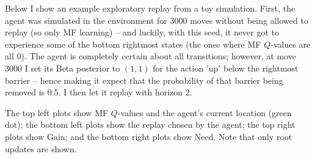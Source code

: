 \documentclass{article}
\begin{document}
Below I show an example exploratory replay from a toy simulation. First, the agent was simulated in the 
environment for 3000 moves without being allowed to replay (so only MF learning) -- and luckily, with 
this seed, it never got to experience some of the bottom rightmost states (the ones where MF $Q$-values are 
all 0). The agent is completely certain 
about all transitions; however, at move 3000 I set its Beta posterior to $(1, 1)$ for the action 'up' below 
the rightmost barrier -- hence making it expect that the probability of that barrier being removed is $0.5$.
I then let it replay with horizon 2.

\bigbreak

The top left plots show MF $Q$-values and the agent's current location (green dot); the bottom left plots show 
the replay chosen by the agent; the top right plots show Gain; and the bottom right plots show Need. Note that 
only root updates are shown.

\newpage
\end{document}
